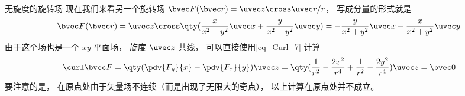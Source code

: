 \begin{example}{无旋度的旋转场}
现在我们来看另一个旋转场 $\bvec F(\bvec r) = \uvec z\cross\uvec r /r$， 写成分量的形式就是
\begin{equation}
\bvec F(\bvec r) = \uvec z \cross \qty(\frac{x}{x^2 + y^2}\uvec x + \frac{y}{x^2 + y^2}\uvec y) = -\frac{y}{x^2 + y^2} \uvec x + \frac{x}{x^2 + y^2}\uvec y
\end{equation}
由于这个场也是一个 $xy$ 平面场， 旋度 $\uvec z$ 共线， 可以直接使用\autoref{eq_Curl_7} 计算
\begin{equation}
\curl\bvec F = \qty(\pdv{F_y}{x} - \pdv{F_x}{y})\uvec z = \qty(\frac{1}{r^2} - \frac{2x^2}{r^4} + \frac{1}{r^2} - \frac{2y^2}{r^4})\uvec z = \bvec 0
\end{equation}
要注意的是， 在原点处由于矢量场不连续（而是出现了无限大的奇点）， 以上计算在原点处并不成立。 
\end{example}
